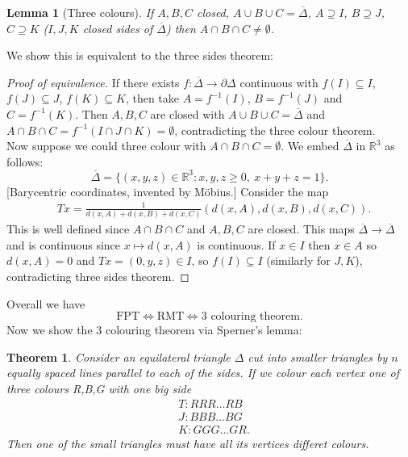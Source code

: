\documentclass[a4paper, 10pt, twocolumn]{amsart}
\newtheorem*{theorem}{Theorem}
\newtheorem*{lemma}{Lemma}
\theoremstyle{definition}
\newcommand{\bb}[1]{\mathbb{#1}}
\newcommand{\sbs}[0]{\subseteq}
\newcommand{\1}{\mathbbm{1}}
\begin{document}
\begin{lemma}[Three colours]
    If $A,B,C$ closed, $A \cup B \cup C = \overline{\Delta}$, $A \supseteq I$, $B \supseteq J$, $C \supseteq K$ ($I,J,K$ closed sides of $\overline{\Delta}$) then $A \cap B \cap C \ne \emptyset$.
\end{lemma}

We show this is equivalent to the three sides theorem:

\begin{proof}[Proof of equivalence]
    If there exists $f: \overline{\Delta} \to \partial \Delta$ continuous with $f(I) \sbs I$, $f(J) \sbs J$, $f(K) \sbs K$, then take $A = f^{-1}(I)$, $B=f^{-1}(J)$ and $C = f^{-1}(K)$. Then $A,B,C$ are closed with $A \cup B \cup C = \overline{\Delta}$ and $A \cap B \cap C = f^{-1}(I \cap J \cap K) = \emptyset$, contradicting the three colour theorem. \\

    Now suppose we could three colour with $A \cap B \cap C = \emptyset$. We embed $\overline{\Delta}$ in $\bb{R}^3$ as follows: \[\overline{\Delta} = \{(x,y,z)\in \bb{R}^3: x,y,z\ge 0, \ x+y+z = 1\}.\]
    [Barycentric coordinates, invented by M\"obius.] Consider the map \begin{align*}
        &Tx = \frac{1}{{d(x,A)+d(x,B)+d(x,C)}}\left( d(x,A), d(x,B),d(x,C)\right).
    \end{align*}
    This is well defined since $A \cap B \cap C$ and $A,B,C$ are closed. This maps $\overline{\Delta} \to \overline{\Delta}$ and is continuous since $x\mapsto d(x,A)$ is continuous. If $x\in I$ then $x \in A$ so $d(x,A) = 0$ and $Tx = (0,y,z) \in I$, so $f(I) \sbs I$ (similarly for $J,K$), contradicting three sides theorem.  
\end{proof}

Overall we have \[\text{FPT} \iff \text{RMT} \iff 3\text{ colouring theorem}.\]
Now we show the 3 colouring theorem via Sperner's lemma:

\begin{theorem}
    Consider an equilateral triangle $\Delta$ cut into smaller triangles by $n$ equally spaced lines parallel to each of the sides. If we colour each vertex one of three colours R,B,G with one big side \begin{align*}
        &T:RRR\ldots RB\\
        &J:BBB\ldots BG\\
        &K:GGG\ldots GR.
    \end{align*}
    Then one of the small triangles must have all its vertices differet colours.
\end{theorem}
\end{document}
